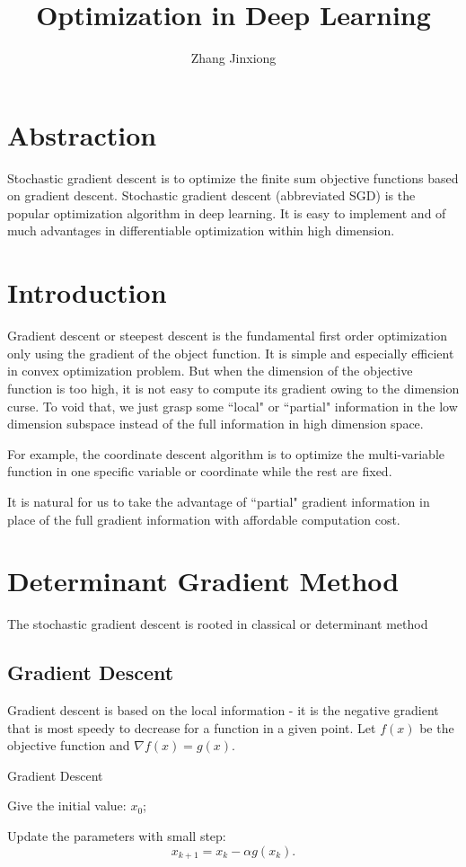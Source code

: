 \documentclass[11pt]{article} %
\title{Optimization in Deep Learning}
\author{Zhang Jinxiong}
\begin{document}
\maketitle
\section{Abstraction}
Stochastic gradient descent is to optimize the finite sum objective functions based on gradient descent.
Stochastic gradient descent (abbreviated SGD) is the popular optimization algorithm in deep learning.
It is easy to implement and of much advantages in differentiable optimization within high dimension.
\section{Introduction}

Gradient descent or steepest descent is the fundamental first order optimization only using the gradient of the object function.
 It is simple and especially efficient in convex optimization problem.
But when the dimension of the objective function is too high, it is not easy to compute its gradient owing to the dimension curse.
To void that, we just grasp some ``local" or ``partial" information in the low dimension subspace instead of the full information in high dimension space.

For example, the coordinate descent algorithm is to optimize the multi-variable function in one specific variable or coordinate while the rest are fixed.

It is natural for us to take the advantage of ``partial" gradient information in place of the full gradient information with affordable computation cost.


\section{Determinant Gradient Method}
The stochastic gradient descent is rooted in classical or determinant method
\subsection{Gradient Descent}
Gradient descent is based on the local information -  it is  the negative gradient that is most speedy to decrease for a function in a given point.
Let $f(x)$ be the objective function and $\nabla f(x) = g(x)$.
\begin{algorithm}[htb]
\caption{Gradient Descent}
\label{GD}
Give the initial value: $x_0$;

Update the parameters with small step: $$x_{k+1}=x_{k} - \alpha g(x_{k}).$$

\end{algorithm}
\end{document}
